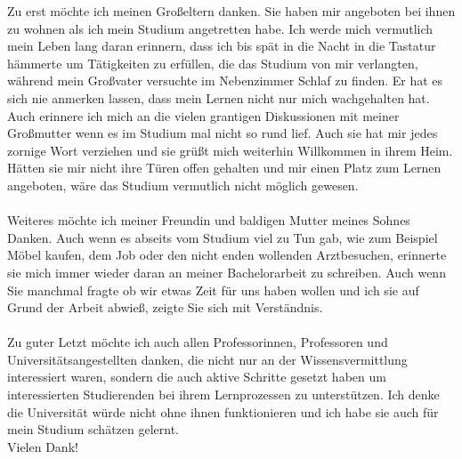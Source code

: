 \documentclass[draft,final]{vutinfth} %
\begin{document}
	


\frontmatter %

\addstatementpage

\begin{danksagung*}
Zu erst möchte ich meinen Großeltern danken. Sie haben mir angeboten bei ihnen zu wohnen als ich mein Studium angetretten habe. Ich werde mich vermutlich mein Leben lang daran erinnern, dass ich bis spät in die Nacht in die Tastatur hämmerte um Tätigkeiten zu erfüllen, die das Studium von mir verlangten, während mein Großvater versuchte im Nebenzimmer Schlaf zu finden. Er hat es sich nie anmerken lassen, dass mein Lernen nicht nur mich wachgehalten hat. Auch erinnere ich mich an die vielen grantigen Diskussionen mit meiner Großmutter wenn es im Studium mal nicht so rund lief. Auch sie hat mir jedes zornige Wort verziehen und sie grüßt mich weiterhin Willkommen in ihrem Heim.\\
Hätten sie mir nicht ihre Türen offen gehalten und mir einen Platz zum Lernen angeboten, wäre das Studium vermutlich nicht möglich gewesen.\\
\\
Weiteres möchte ich meiner Freundin und baldigen Mutter meines Sohnes Danken. Auch wenn es abseits vom Studium viel zu Tun gab, wie zum Beispiel Möbel kaufen, dem Job oder den nicht enden wollenden Arztbesuchen, erinnerte sie mich immer wieder daran an meiner Bachelorarbeit zu schreiben. Auch wenn Sie manchmal fragte ob wir etwas Zeit für uns haben wollen und ich sie auf Grund der Arbeit abwieß, zeigte Sie sich mit Verständnis.\\
\\
Zu guter Letzt möchte ich auch allen Professorinnen, Professoren und Universitätsangestellten danken, die nicht nur an der Wissensvermittlung interessiert waren, sondern die auch aktive Schritte gesetzt haben um interessierten Studierenden bei ihrem Lernprozessen zu unterstützen. Ich denke die Universität würde nicht ohne ihnen funktionieren und ich habe sie auch für mein Studium schätzen gelernt.\\
Vielen Dank!
\end{danksagung*}

\begin{acknowledgements*}
\end{acknowledgements*}
\end{document}
